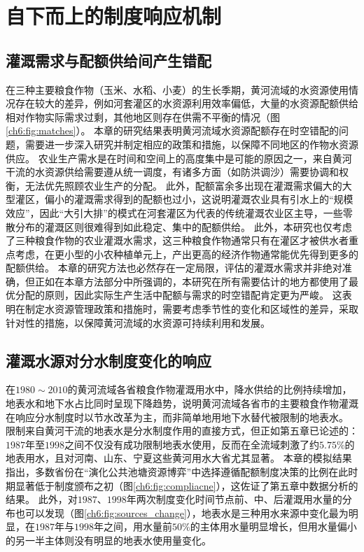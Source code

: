 \section{自下而上的制度响应机制}

\subsection{灌溉需求与配额供给间产生错配}

在三种主要粮食作物（玉米、水稻、小麦）的生长季期，黄河流域的水资源使用情况存在较大的差异，例如河套灌区的水资源利用效率偏低，大量的水资源配额供给相对作物实际需求过剩，其他地区则存在供需不平衡的情况（图\ref{ch6:fig:matches}）。
本章的研究结果表明黄河流域水资源配额存在时空错配的问题，需要进一步深入研究并制定相应的政策和措施，以保障不同地区的作物水资源供应。
农业生产需水是在时间和空间上的高度集中是可能的原因之一，来自黄河干流的水资源供给需要遵从统一调度，有诸多方面（如防洪调沙）需要协调和权衡，无法优先照顾农业生产的分配。
此外，配额富余多出现在灌溉需求偏大的大型灌区，偏小的灌溉需求得到的配额也过小，这说明灌溉农业具有引水上的“规模效应”，因此“大引大排”的模式在河套灌区为代表的传统灌溉农业区主导，一些零散分布的灌溉区则很难得到如此稳定、集中的配额供给。
此外，本研究也仅考虑了三种粮食作物的农业灌溉水需求，这三种粮食作物通常只有在灌区才被供水者重点考虑，在更小型的小农种植单元上，产出更高的经济作物通常能优先得到更多的配额供给。
本章的研究方法也必然存在一定局限，评估的灌溉水需求并非绝对准确，但正如在本章方法部分中所强调的，本研究在所有需要估计的地方都使用了最优分配的原则，因此实际生产生活中配额与需求的时空错配肯定更为严峻。
这表明在制定水资源管理政策和措施时，需要考虑季节性的变化和区域性的差异，采取针对性的措施，以保障黄河流域的水资源可持续利用和发展。


\subsection{灌溉水源对分水制度变化的响应}

在$1980 \sim 2010$的黄河流域各省粮食作物灌溉用水中，降水供给的比例持续增加，地表水和地下水占比同时呈现下降趋势，说明黄河流域各省市的主要粮食作物灌溉在响应分水制度时以节水改革为主，而非简单地用地下水替代被限制的地表水。
限制来自黄河干流的地表水是分水制度作用的直接方式，但正如第五章已论述的：$1987$年至$1998$之间不仅没有成功限制地表水使用，反而在全流域刺激了约$5.75\%$的地表用水，且对河南、山东、宁夏这些黄河用水大省尤其显著。
本章的模拟结果指出，多数省份在“演化公共池塘资源博弈”中选择遵循配额制度决策的比例在此时期显著低于制度颁布之初（图\ref{ch6:fig:compliacne}），这佐证了第五章中数据分析的结果。
此外，对$1987$、$1998$年两次制度变化时间节点前、中、后灌溉用水量的分布也可以发现（图\ref{ch6:fig:sources_change}），地表水是三种用水来源中变化最为明显，在$1987$年与$1998$年之间，用水量前$50\%$的主体用水量明显增长，但用水量偏小的另一半主体则没有明显的地表水使用量变化。


